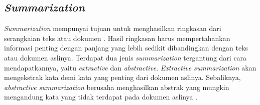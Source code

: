 \subsection{\textit{Summarization}}

\textit{Summarization} mempunyai tujuan untuk menghasilkan ringkasan dari serangkaian teks atau dokumen \parencite{summarization}. Hasil ringkasan harus mempertahankan informasi penting dengan panjang yang lebih sedikit dibandingkan dengan teks atau dokumen aslinya. Terdapat dua jenis \textit{summarization} tergantung dari cara mendapatkannya, yaitu \textit{extractive} dan \textit{abstractive}. \textit{Extractive summarization} akan mengekstrak kata demi kata yang penting dari dokumen aslinya. Sebaliknya, \textit{abstractive summarization} berusaha menghasilkan abstrak yang mungkin mengandung kata yang tidak terdapat pada dokumen aslinya \parencite{summarization}.


